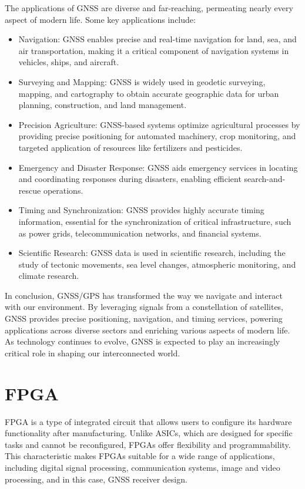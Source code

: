 The applications of GNSS are diverse and far-reaching, permeating nearly every aspect of modern life. Some key applications include:
\begin{itemize}
    \item Navigation: GNSS enables precise and real-time navigation for land, sea, and air transportation, making it a critical component of navigation systems in vehicles, ships, and aircraft.
    \item Surveying and Mapping: GNSS is widely used in geodetic surveying, mapping, and cartography to obtain accurate geographic data for urban planning, construction, and land management.
    \item Precision Agriculture: GNSS-based systems optimize agricultural processes by providing precise positioning for automated machinery, crop monitoring, and targeted application of resources like fertilizers and pesticides.
    \item Emergency and Disaster Response: GNSS aids emergency services in locating and coordinating responses during disasters, enabling efficient search-and-rescue operations.
    \item Timing and Synchronization: GNSS provides highly accurate timing information, essential for the synchronization of critical infrastructure, such as power grids, telecommunication networks, and financial systems.
    \item Scientific Research: GNSS data is used in scientific research, including the study of tectonic movements, sea level changes, atmospheric monitoring, and climate research.
\end{itemize}

In conclusion, GNSS/GPS has transformed the way we navigate and interact with our environment. By leveraging signals from a constellation of satellites, GNSS provides precise positioning, navigation, and timing services, powering applications across diverse sectors and enriching various aspects of modern life. As technology continues to evolve, GNSS is expected to play an increasingly critical role in shaping our interconnected world.

\section{FPGA}
FPGA is a type of integrated circuit that allows users to configure its hardware functionality after manufacturing. Unlike ASICs, which are designed for specific tasks and cannot be reconfigured, FPGAs offer flexibility and programmability. This characteristic makes FPGAs suitable for a wide range of applications, including digital signal processing, communication systems, image and video processing, and in this case, GNSS receiver design.

